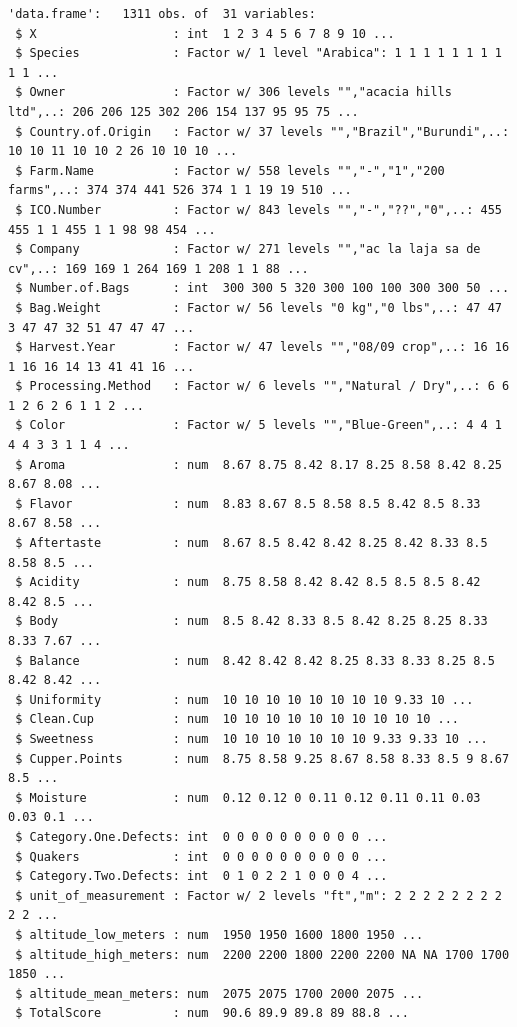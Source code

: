 \documentclass[
  letterpaper,
  DIV=11,
  numbers=noendperiod]{scrreprt}
\begin{document}
\begin{verbatim}
'data.frame':   1311 obs. of  31 variables:
 $ X                   : int  1 2 3 4 5 6 7 8 9 10 ...
 $ Species             : Factor w/ 1 level "Arabica": 1 1 1 1 1 1 1 1 1 1 ...
 $ Owner               : Factor w/ 306 levels "","acacia hills ltd",..: 206 206 125 302 206 154 137 95 95 75 ...
 $ Country.of.Origin   : Factor w/ 37 levels "","Brazil","Burundi",..: 10 10 11 10 10 2 26 10 10 10 ...
 $ Farm.Name           : Factor w/ 558 levels "","-","1","200 farms",..: 374 374 441 526 374 1 1 19 19 510 ...
 $ ICO.Number          : Factor w/ 843 levels "","-","??","0",..: 455 455 1 1 455 1 1 98 98 454 ...
 $ Company             : Factor w/ 271 levels "","ac la laja sa de cv",..: 169 169 1 264 169 1 208 1 1 88 ...
 $ Number.of.Bags      : int  300 300 5 320 300 100 100 300 300 50 ...
 $ Bag.Weight          : Factor w/ 56 levels "0 kg","0 lbs",..: 47 47 3 47 47 32 51 47 47 47 ...
 $ Harvest.Year        : Factor w/ 47 levels "","08/09 crop",..: 16 16 1 16 16 14 13 41 41 16 ...
 $ Processing.Method   : Factor w/ 6 levels "","Natural / Dry",..: 6 6 1 2 6 2 6 1 1 2 ...
 $ Color               : Factor w/ 5 levels "","Blue-Green",..: 4 4 1 4 4 3 3 1 1 4 ...
 $ Aroma               : num  8.67 8.75 8.42 8.17 8.25 8.58 8.42 8.25 8.67 8.08 ...
 $ Flavor              : num  8.83 8.67 8.5 8.58 8.5 8.42 8.5 8.33 8.67 8.58 ...
 $ Aftertaste          : num  8.67 8.5 8.42 8.42 8.25 8.42 8.33 8.5 8.58 8.5 ...
 $ Acidity             : num  8.75 8.58 8.42 8.42 8.5 8.5 8.5 8.42 8.42 8.5 ...
 $ Body                : num  8.5 8.42 8.33 8.5 8.42 8.25 8.25 8.33 8.33 7.67 ...
 $ Balance             : num  8.42 8.42 8.42 8.25 8.33 8.33 8.25 8.5 8.42 8.42 ...
 $ Uniformity          : num  10 10 10 10 10 10 10 10 9.33 10 ...
 $ Clean.Cup           : num  10 10 10 10 10 10 10 10 10 10 ...
 $ Sweetness           : num  10 10 10 10 10 10 10 9.33 9.33 10 ...
 $ Cupper.Points       : num  8.75 8.58 9.25 8.67 8.58 8.33 8.5 9 8.67 8.5 ...
 $ Moisture            : num  0.12 0.12 0 0.11 0.12 0.11 0.11 0.03 0.03 0.1 ...
 $ Category.One.Defects: int  0 0 0 0 0 0 0 0 0 0 ...
 $ Quakers             : int  0 0 0 0 0 0 0 0 0 0 ...
 $ Category.Two.Defects: int  0 1 0 2 2 1 0 0 0 4 ...
 $ unit_of_measurement : Factor w/ 2 levels "ft","m": 2 2 2 2 2 2 2 2 2 2 ...
 $ altitude_low_meters : num  1950 1950 1600 1800 1950 ...
 $ altitude_high_meters: num  2200 2200 1800 2200 2200 NA NA 1700 1700 1850 ...
 $ altitude_mean_meters: num  2075 2075 1700 2000 2075 ...
 $ TotalScore          : num  90.6 89.9 89.8 89 88.8 ...
\end{verbatim}
\end{document}
